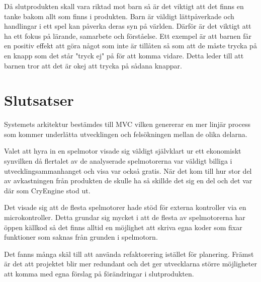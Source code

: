 \documentclass[a4paper,12pt,oneside,final]{extbook}
\begin{document}
Då slutprodukten skall vara riktad mot barn så är det viktigt att det finns en tanke bakom allt som finns i produkten. Barn är väldigt lättpåverkade och handlingar i ett spel kan påverka deras syn på världen. Därför är det viktigt att ha ett fokus på lärande, samarbete och förståelse. Ett exempel är att barnen får en positiv effekt att göra något som inte är tillåten så som att de måste trycka på en knapp som det står "tryck ej" på för att komma vidare. Detta leder till att barnen tror att det är okej att trycka på sådana knappar.


\chapter{Slutsatser}
Systemets arkitektur bestämdes till MVC vilken genererar en mer linjär process som kommer underlätta utvecklingen och felsökningen mellan de olika delarna.

Valet att hyra in en spelmotor visade sig väldigt självklart ur ett ekonomiskt synvilken då flertalet av de analyserade spelmotorerna var väldigt billiga i utvecklingsammanhanget och visa var också gratis. När det kom till hur stor del av avkastningen från produkten de skulle ha så skillde det sig en del och det var där som CryEngine stod ut. 

Det visade sig att de flesta spelmotorer hade stöd för externa kontroller via en microkontroller. Detta grundar sig mycket i att de flesta av spelmotorerna har öppen källkod så det finns alltid en möjlighet att skriva egna koder som fixar funktioner som saknas från grunden i spelmotorn.

Det fanns många skäl till att använda refaktorering istället för planering. Främst är det att projektet blir mer redundant och det ger utvecklarna större möjligheter att komma med egna förslag på förändringar i slutprodukten.







\pagestyle{empty}

\appendix
\end{document}
